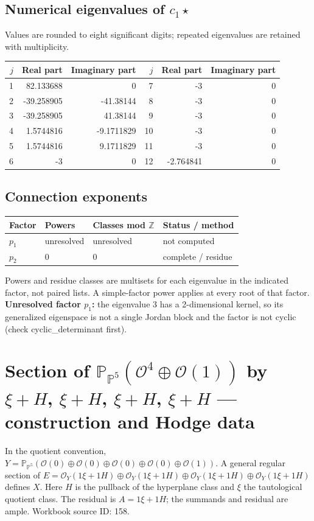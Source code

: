 \documentclass[10pt,a4paper]{article}
\begin{document}
\subsection*{Numerical eigenvalues of $c_1\star$}
Values are rounded to eight significant digits; repeated eigenvalues are retained with multiplicity.
\begin{center}\small\begin{tabular}{rrr@{\qquad}rrr}\toprule $j$ & Real part & Imaginary part & $j$ & Real part & Imaginary part\\\midrule
1 & 82.133688 & 0 & 7 & -3 & 0\\
2 & -39.258905 & -41.38144 & 8 & -3 & 0\\
3 & -39.258905 & 41.38144 & 9 & -3 & 0\\
4 & 1.5744816 & -9.1711829 & 10 & -3 & 0\\
5 & 1.5744816 & 9.1711829 & 11 & -3 & 0\\
6 & -3 & 0 & 12 & -2.764841 & 0\\
\bottomrule\end{tabular}\end{center}
\subsection*{Connection exponents}
\begin{center}\begin{tabular}{llll}\toprule Factor & Powers & Classes mod $\mathbb Z$ & Status / method\\\midrule
$p_{1}$ & unresolved & unresolved & not computed\\
$p_{2}$ & $0$ & $0$ & complete / residue\\
\bottomrule\end{tabular}\end{center}
Powers and residue classes are multisets for each eigenvalue in the indicated factor, not paired lists. A simple-factor power applies at every root of that factor.
\textbf{Unresolved factor $p_{1}$:} the eigenvalue 3 has a 2-dimensional kernel, so its generalized eigenspace is not a single Jordan block and the factor is not cyclic (check cyclic\_determinant first).
\clearpage\section*{Section of $\mathbb P_{\mathbb P^{5}}(\mathcal O^{4}\oplus \mathcal O(1))$ by $\xi +H$, $\xi +H$, $\xi +H$, $\xi +H$ --- construction and Hodge data}\label{entry:PB5-158}
In the quotient convention, $Y=\mathbb P_{\mathbb P^{5}}(\mathcal O(0)\oplus\mathcal O(0)\oplus\mathcal O(0)\oplus\mathcal O(0)\oplus\mathcal O(1))$.
A general regular section of $E=\mathcal O_Y(1\xi+1H)\oplus\mathcal O_Y(1\xi+1H)\oplus\mathcal O_Y(1\xi+1H)\oplus\mathcal O_Y(1\xi+1H)$ defines $X$.
Here $H$ is the pullback of the hyperplane class and $\xi$ the tautological quotient class. The residual is $A=1\xi+1H$; the summands and residual are ample.
Workbook source ID: 158.
\end{document}
